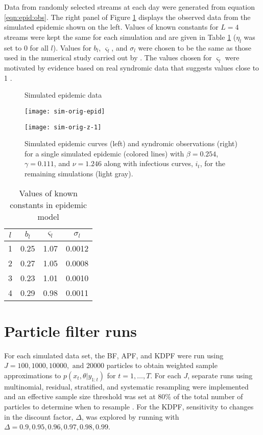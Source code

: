 Data from randomly selected streams at each day were generated from equation \eqref{eqn:epid:obs}. The right panel of Figure \ref{fig:epid:data} displays the observed data from the simulated epidemic shown on the left. Values of known constants for $L = 4$ streams were kept the same for each simulation and are given in Table \ref{tab:epid:constants} ($\eta_l$ was set to 0 for all $l$). Values for $b_l$, $\varsigma_l$, and $\sigma_l$ were chosen to be the same as those used in the numerical study carried out by \citet{skvortsov2012monitoring}. The values chosen for $\varsigma_l$ were motivated by evidence based on real syndromic data that suggests values close to 1 \citep{chew2010twitter}.

\begin{figure}
\ssp
\centering
\caption{Simulated epidemic data} \label{fig:epid:data}
\begin{minipage}{0.48\linewidth}
\texttt{[image: sim-orig-epid]}
\end{minipage}
\begin{minipage}{0.48\linewidth}
\texttt{[image: sim-orig-z-1]}
\end{minipage}
\caption*{Simulated epidemic curves (left) and syndromic observations (right) for a single simulated epidemic (colored lines) with $\beta = 0.254$, $\gamma = 0.111$, and $\nu = 1.246$ along with infectious curves, $i_t$, for the remaining simulations (light gray).}
\end{figure}

\begin{table}
\ssp
\centering
\caption{Values of known constants in epidemic model} \label{tab:epid:constants}
\begin{tabular}{|cccc|}
\hline
$l$ & $b_l$ & $\varsigma_l$ & $\sigma_l$ \\
\hline
1 & 0.25 & 1.07 & 0.0012 \\
2 & 0.27 & 1.05 & 0.0008 \\
3 & 0.23 & 1.01 & 0.0010 \\
4 & 0.29 & 0.98 & 0.0011 \\
\hline
\end{tabular}
\end{table}

\section{Particle filter runs} \label{sec:epid:pf}

For each simulated data set, the BF, APF, and KDPF were run using $J = 100, 1000, 10000, \mbox{ and } 20000$ particles to obtain weighted sample approximations to $p(x_t,\theta|y_{1:t})$ for $t = 1,\ldots,T$. For each $J$, separate runs using multinomial, residual, stratified, and systematic resampling were implemented \citep{smcUtils} and an effective sample size threshold was set at 80\% of the total number of particles to determine when to resample \citep{Liu:Chen:Wong:reje:1998}. For the KDPF, sensitivity to changes in the discount factor, $\Delta$, was explored by running with $\Delta = 0.9, 0.95, 0.96, 0.97, 0.98, 0.99$.

